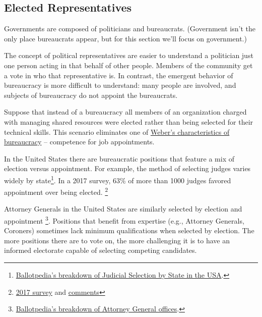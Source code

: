 \subsection*{Elected Representatives}
Governments are composed of politicians and bureaucrats. (Government isn't the only place bureaucrats appear, but for this section we'll focus on government.)

The concept of political representatives are easier to understand a politician just one person acting in that behalf of other people. Members of the community get a vote in who that representative is.
In contrast, the emergent behavior of bureaucracy is more difficult to understand: many people are involved, and subjects of bureaucracy do not appoint the bureaucrats. 

Suppose that instead of a bureaucracy all members of an organization charged with managing \glspl{shared resource} were elected rather than being selected for their technical skills. This scenario eliminates one of \href{https://en.wikipedia.org/wiki/Bureaucracy#Max_Weber}{Weber's characteristics of bureaucracy}
-- competence for job appointments. 

In the United States there are bureaucratic positions that feature a mix of election versus appointment. For example, the method of selecting judges varies widely by state\footnote{\href{https://ballotpedia.org/Judicial_selection_in_the_states}{Ballotpedia's breakdown of Judicial Selection by State in the USA}.}. In a 2017 survey, 63\% of more than 1000 judges favored appointment over being elected. \footnote{\href{https://www.judges.org/news-and-info/the-age-old-question-should-judges-be-appointed-or-elected-heres-what-you-said/}{2017 survey} and \href{https://www.judges.org/wp-content/uploads/2020/03/Q1_Text.pdf}{comments}}

Attorney Generals in the United States are similarly  selected by election and appointment
\footnote{\href{https://ballotpedia.org/Attorney_General_office_comparison}{Ballotpedia's breakdown of Attorney General offices}.}. Positions that benefit from expertise (e.g., Attorney Generals, Coroners) sometimes lack minimum qualifications when selected by election. The more positions there are to vote on, the more challenging it is to have an informed electorate capable of selecting competing candidates.


